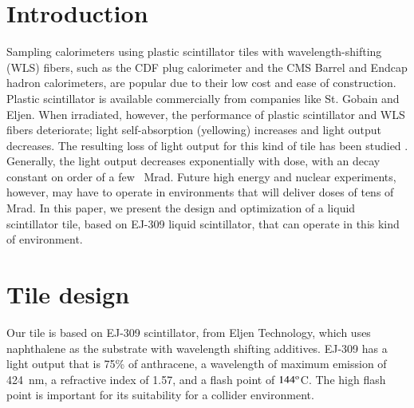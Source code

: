 \documentclass[review]{elsarticle}
\begin{document}
\linenumbers

\section{Introduction}
Sampling calorimeters using plastic scintillator tiles with
wavelength-shifting (WLS) fibers, such as the CDF plug
calorimeter\cite{Aota1995557} and the CMS Barrel\cite{CMSHB} and
Endcap\cite{HCALTDR1997} hadron calorimeters, are popular due to their
low cost and ease of construction. Plastic scintillator is available
commercially from companies like St. Gobain and Eljen. When
irradiated, however, the performance of plastic scintillator and WLS
fibers deteriorate; light self-absorption (yellowing) increases and
light output decreases. The resulting loss of light output for this
kind of tile has been studied \cite{vasken,ByonWagner1993263}.
Generally, the light output decreases exponentially with dose, with an
decay constant on order of a few~ Mrad. Future high energy and nuclear
experiments, however, may have to operate in environments that will
deliver doses of tens of Mrad. In this paper, we present the design
and optimization of a liquid scintillator tile, based on EJ-309 liquid
scintillator, that can operate in this kind of environment.

\section{Tile design}
\label{sec:design}
Our tile is based on EJ-309 scintillator, from Eljen Technology, which
uses naphthalene as the substrate with wavelength shifting additives.
EJ-309 has a light output that is 75\% of anthracene, a wavelength of
maximum emission of 424~nm, a refractive index of 1.57, and a flash
point of $\rm{144^o}$C. The high flash point is important for its
suitability for a collider environment.
\end{document}

